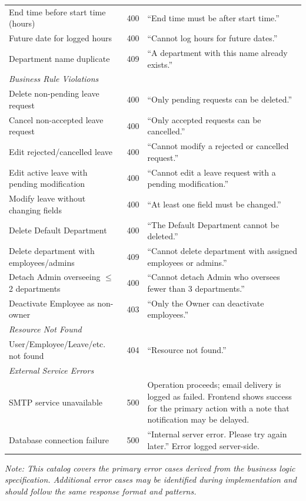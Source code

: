 \documentclass[11pt,a4paper]{article}
\begin{document}
\begin{longtable}{p{5.5cm} p{2cm} p{6cm}}
End time before start time (hours) & 400 & ``End time must be after start time.'' \\
Future date for logged hours & 400 & ``Cannot log hours for future dates.'' \\
Department name duplicate & 409 & ``A department with this name already exists.'' \\
\midrule
\multicolumn{3}{l}{\textit{Business Rule Violations}} \\
\midrule
Delete non-pending leave request & 400 & ``Only pending requests can be deleted.'' \\
Cancel non-accepted leave request & 400 & ``Only accepted requests can be cancelled.'' \\
Edit rejected/cancelled leave & 400 & ``Cannot modify a rejected or cancelled request.'' \\
Edit active leave with pending modification & 400 & ``Cannot edit a leave request with a pending modification.'' \\
Modify leave without changing fields & 400 & ``At least one field must be changed.'' \\
Delete Default Department & 400 & ``The Default Department cannot be deleted.'' \\
Delete department with employees/admins & 409 & ``Cannot delete department with assigned employees or admins.'' \\
Detach Admin overseeing $\leq$ 2 departments & 400 & ``Cannot detach Admin who oversees fewer than 3 departments.'' \\
Deactivate Employee as non-owner & 403 & ``Only the Owner can deactivate employees.'' \\
\midrule
\multicolumn{3}{l}{\textit{Resource Not Found}} \\
\midrule
User/Employee/Leave/etc. not found & 404 & ``Resource not found.'' \\
\midrule
\multicolumn{3}{l}{\textit{External Service Errors}} \\
\midrule
SMTP service unavailable & 500 & Operation proceeds; email delivery is logged as failed. Frontend shows success for the primary action with a note that notification may be delayed. \\
Database connection failure & 500 & ``Internal server error. Please try again later.'' Error logged server-side. \\
\bottomrule
\end{longtable}

\textit{Note: This catalog covers the primary error cases derived from the business logic specification. Additional error cases may be identified during implementation and should follow the same response format and patterns.}
\end{document}
